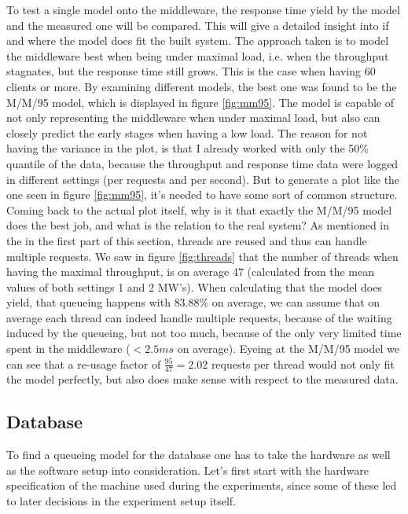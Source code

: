 \documentclass[11pt]{article}
\begin{document}
To test a single model onto the middleware, the response time yield by the model and the measured one will be compared. This will give a detailed insight into if and where the model does fit the built system. The approach taken is to model the middleware best when being under maximal load, i.e. when the throughput stagnates, but the response time still grows. This is the case when having 60 clients or more. By examining different models, the best one was found to be the M/M/95 model, which is displayed in figure \ref{fig:mm95}. The model is capable of not only representing the middleware when under maximal load, but also can closely predict the early stages when having a low load. The reason for not having the variance in the plot, is that I already worked with only the 50\% quantile of the data, because the throughput and response time data were logged in different settings (per requests and per second). But to generate a plot like the one seen in figure \ref{fig:mm95}, it's needed to have some sort of common structure. Coming back to the actual plot itself, why is it that exactly the M/M/95 model does the best job, and what is the relation to the real system? As mentioned in the in the first part of this section, threads are reused and thus can handle multiple requests. We saw in figure \ref{fig:threads} that the number of threads when having the maximal throughput, is on average 47 (calculated from the mean values of both settings 1 and 2 MW's). When calculating that the model does yield, that queueing happens with $83.88\%$ on average, we can assume that on average each thread can indeed handle multiple requests, because of the waiting induced by the queueing, but not too much, because of the only very limited time spent in the middleware ($<2.5ms$ on average). Eyeing at the M/M/95 model we can see that a re-usage factor of $\frac{95}{47}=2.02$ requests per thread would not only fit the model perfectly, but also does make sense with respect to the measured data.

\subsection{Database}
To find a queueing model for the database one has to take the hardware as well as the software setup into consideration. Let's first start with the hardware specification of the machine used during the experiments, since some of these led to later decisions in the experiment setup itself.
\end{document}
